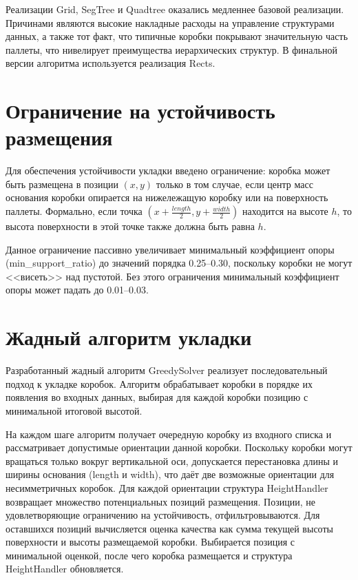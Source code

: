 Реализации Grid, SegTree и Quadtree оказались медленнее базовой реализации. Причинами являются высокие накладные расходы на управление структурами данных, а также тот факт, что типичные коробки покрывают значительную часть паллеты, что нивелирует преимущества иерархических структур. В финальной версии алгоритма используется реализация Rects.

\section{Ограничение на устойчивость размещения}

Для обеспечения устойчивости укладки введено ограничение: коробка может быть размещена в позиции $(x, y)$ только в том случае, если центр масс основания коробки опирается на нижележащую коробку или на поверхность паллеты. Формально, если точка $(x + \frac{length}{2}, y + \frac{width}{2})$ находится на высоте $h$, то высота поверхности в этой точке также должна быть равна $h$.

Данное ограничение пассивно увеличивает минимальный коэффициент опоры (min\_support\_ratio) до значений порядка 0.25--0.30, поскольку коробки не могут <<висеть>> над пустотой. Без этого ограничения минимальный коэффициент опоры может падать до 0.01--0.03.

\section{Жадный алгоритм укладки}

Разработанный жадный алгоритм GreedySolver реализует последовательный подход к укладке коробок. Алгоритм обрабатывает коробки в порядке их появления во входных данных, выбирая для каждой коробки позицию с минимальной итоговой высотой.

На каждом шаге алгоритм получает очередную коробку из входного списка и рассматривает допустимые ориентации данной коробки. Поскольку коробки могут вращаться только вокруг вертикальной оси, допускается перестановка длины и ширины основания (length и width), что даёт две возможные ориентации для несимметричных коробок. Для каждой ориентации структура HeightHandler возвращает множество потенциальных позиций размещения. Позиции, не удовлетворяющие ограничению на устойчивость, отфильтровываются. Для оставшихся позиций вычисляется оценка качества как сумма текущей высоты поверхности и высоты размещаемой коробки. Выбирается позиция с минимальной оценкой, после чего коробка размещается и структура HeightHandler обновляется.

